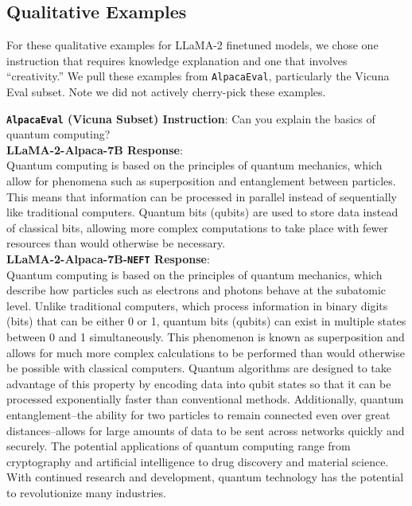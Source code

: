\documentclass{article} %
\newcommand{\neft}{\texttt{NEFT}}
\newcommand{\llama}{LLaMA}
\begin{document}
\subsection{Qualitative Examples}
For these qualitative examples for \llama{}-2 finetuned models, we chose one instruction that requires knowledge explanation and one that involves ``creativity.'' We pull these examples from \texttt{AlpacaEval}, particularly the Vicuna Eval subset. Note we did not actively cherry-pick these examples.
\begin{tcolorbox}[breakable,boxrule=0pt]
  \textbf{\texttt{AlpacaEval} (Vicuna Subset) Instruction}: Can you explain the basics of quantum computing?\\
    \textbf{\llama{}-2-Alpaca-7B Response}: \\Quantum computing is based on the principles of quantum mechanics, which allow for phenomena such as superposition and entanglement between particles. This means that information can be processed in parallel instead of sequentially like traditional computers. Quantum bits (qubits) are used to store data instead of classical bits, allowing more complex computations to take place with fewer resources than would otherwise be necessary. \\
  \textbf{\llama{}-2-Alpaca-7B-\neft{} Response}:\\Quantum computing is based on the principles of quantum mechanics, which describe how particles such as electrons and photons behave at the subatomic level. Unlike traditional computers, which process information in binary digits (bits) that can be either 0 or 1, quantum bits (qubits) can exist in multiple states between 0 and 1 simultaneously. This phenomenon is known as superposition and allows for much more complex calculations to be performed than would otherwise be possible with classical computers. Quantum algorithms are designed to take advantage of this property by encoding data into qubit states so that it can be processed exponentially faster than conventional methods. Additionally, quantum entanglement--the ability for two particles to remain connected even over great distances--allows for large amounts of data to be sent across networks quickly and securely. The potential applications of quantum computing range from cryptography and artificial intelligence to drug discovery and material science. With continued research and development, quantum technology has the potential to revolutionize many industries.

\end{tcolorbox}
\end{document}
